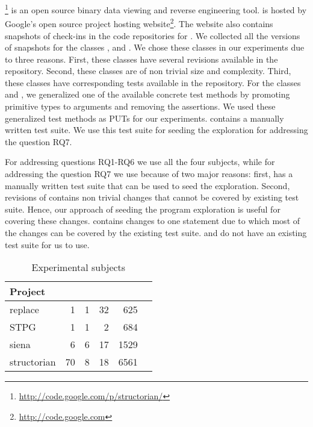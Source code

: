 \footnote{\url{http://code.google.com/p/structorian/}} is an open source binary data viewing and reverse engineering tool.  is hosted by Google's open source project hosting website\footnote{\url{http://code.google.com}}. The website also contains snapshots of check-ins in the code repositories for . We collected all the versions of snapshots for the classes ,  and . We chose these classes in our experiments due to three reasons. First, these classes have several revisions available in the repository. Second, these classes are of non trivial size and complexity. Third, these classes have corresponding tests available in the repository. For the classes  and  , we generalized one of the available concrete test methods by promoting primitive types to arguments and removing the assertions. We used these generalized test methods as PUTs for our experiments.  contains a manually written test suite. We use this test suite for seeding the exploration for addressing the question RQ7.

For addressing questions RQ1-RQ6 we use all the four subjects, while for addressing the question RQ7 we use  because of two major reasons: first,  has a manually written test suite that can be used to seed the exploration. Second, revisions of  contains non trivial changes that cannot be covered by existing test suite. Hence, our approach of seeding the program exploration is useful for covering these changes.  contains changes to one statement due to which most of the changes can be covered by the existing test suite.  and  do not have an existing test suite for us to use.

\setlength{\tabcolsep}{6pt}
\begin{table}
\begin{CodeOut}
\begin{center}
\caption {\label{table:subjects}Experimental subjects}
\begin {tabular} {|l|r|r|r|r|r|}
\hline
Project&\CenterCell{Classes}&\CenterCell{Classes Covered}&\CenterCell{Versions}&\CenterCell{LOC}\\

\hline
\hline replace &1&1&32&625\\
\hline STPG &1&1&2&684\\
\hline siena &6&6&17&1529\\
\hline structorian &70&8&18&6561\\
\hline
\end{tabular}
\end{center}
\end{CodeOut}
\vspace{- 0.3 in}
\end{table}



